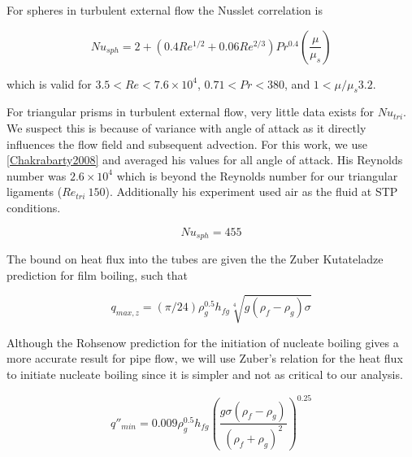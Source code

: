 \documentclass[compileTAMUreport.tex]{subfiles}
\begin{document}
For spheres in turbulent external flow the Nusslet correlation is\cite{Incropera}

\begin{equation}
Nu_{sph} = 2+ (0.4Re^{1/2} +0.06 Re^{2/3})Pr^{0.4} \left( \frac{\mu}{\mu_s} \right)
\end{equation}

which is valid for $3.5<Re<7.6\times 10^{4}$, $0.71<Pr<380$, and $1 < \mu / \mu_s 3.2$.


For triangular prisms in turbulent external flow, very little data exists for $Nu_{tri}$. We suspect this is because of variance with angle of attack as it directly influences the flow field and subsequent advection. For this work, we use \ref{Chakrabarty2008} and averaged his values for all angle of attack. His Reynolds number was $2.6 \times 10^4$ which is beyond the Reynolds number for our triangular ligaments ($Re_{tri} ~ 150$). Additionally his experiment used air as the fluid at STP conditions. \cite{JAEGER2013}

\begin{equation}
Nu_{sph} = 455
\end{equation}


The bound on heat flux into the tubes are given the the Zuber Kutateladze prediction for film boiling, such that

\begin{equation}
q_{max,z} = (\pi/24)\rho_g^{0.5} h_{fg} \sqrt[4]{g (\rho_{f} - \rho_{g}) \sigma}
\end{equation}

Although the Rohsenow prediction for the initiation of nucleate boiling gives a more accurate result for pipe flow, we will use Zuber's relation for the heat flux to initiate nucleate boiling since it is simpler and not as critical to our analysis.
\cite{Incropera}

\begin{equation}
q''_{min} = 0.009 \rho_g^{0.5} h_{fg} \left( \frac{g\sigma \left( \rho_f - \rho_g \right)}{(\rho_f + \rho_g)^2} \right)^0.25
\end{equation}
\end{document}
